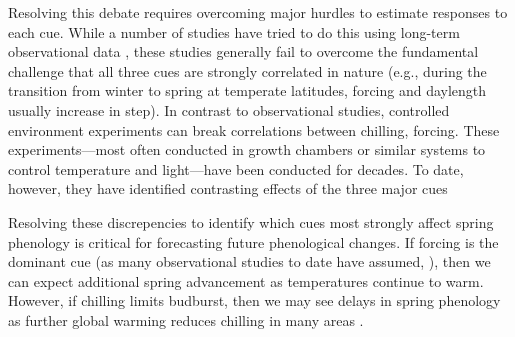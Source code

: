 \documentclass{article}
\begin{document}
\par Resolving this debate requires overcoming major hurdles to estimate responses to each cue. While a number of studies have tried to do this using long-term observational data \citep{vitasse2013, zohner2016}, these studies generally fail to overcome the fundamental challenge that all three cues are strongly correlated in nature (e.g., during the transition from winter to spring at temperate latitudes, forcing and daylength usually increase in step). In contrast to observational studies, controlled environment experiments can break correlations between chilling, forcing. These experiments---most often conducted in growth chambers or similar systems to control temperature and light---have been conducted for decades. To date, however, they have identified contrasting effects of the three major cues \citep{zohner2016,Laube:2014a,Basler:2012,Caffarra:2011b,Caffarra:2011a}

\par Resolving these discrepencies to identify which cues most strongly affect spring phenology is critical for forecasting future phenological changes. If forcing is the dominant cue (as many observational studies to date have assumed, \citep{bradley1999,menzel2006,harrington2015}), then we can expect additional spring advancement as temperatures continue to warm. However, if chilling limits budburst, then we may see delays in spring phenology as further global warming reduces chilling in many areas \citep{fraga2019}. 
\end{document}
